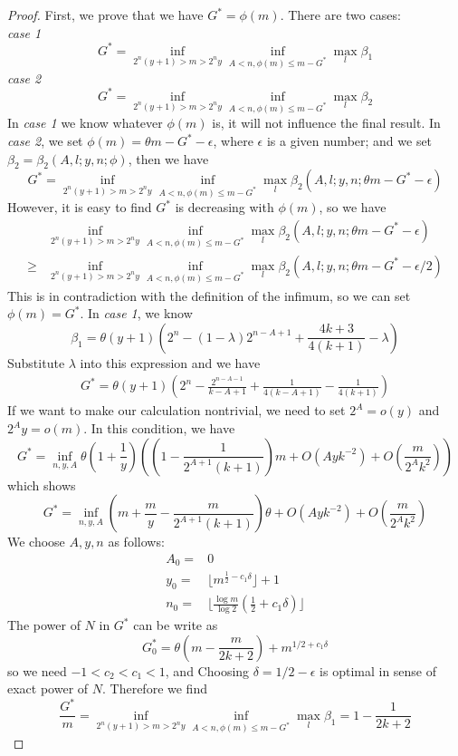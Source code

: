 \documentclass[10pt]{article}
\begin{document}
\begin{proof}
First, we prove that we have $G^*=\phi(m)$. There are two cases:\\
\emph{case 1}
\[
G^*=\inf\limits_{2^n(y+1)>m>2^ny}\inf\limits_{A<n,\phi(m)\leq m-G^*}\max\limits_{l}\beta_1
\]
\emph{case 2}
\[
G^*=\inf\limits_{2^n(y+1)>m>2^ny}\inf\limits_{A<n,\phi(m)\leq m-G^*}\max\limits_{l}\beta_2
\]
In \emph{case 1} we know whatever $\phi(m)$ is, it will not influence the final result. In \emph{case 2}, we set $\phi(m)=\theta m-G^*-\epsilon$, where $\epsilon$ is a given number; and we set $\beta_2=\beta_2(A,l;y,n;\phi)$, then we have
\[
G^*=\inf\limits_{2^n(y+1)>m>2^ny}\inf\limits_{A<n,\phi(m)\leq m-G^*}\max\limits_{l}\beta_2(A,l;y,n;\theta m-G^*-\epsilon)
\]
However, it is easy to find $G^*$ is decreasing with $\phi(m)$, so we have
\begin{align*}
&\inf\limits_{2^n(y+1)>m>2^ny}\inf\limits_{A<n,\phi(m)\leq m-G^*}\max\limits_{l}\beta_2(A,l;y,n;\theta m-G^*-\epsilon)\\
\geq&\inf\limits_{2^n(y+1)>m>2^ny}\inf\limits_{A<n,\phi(m)\leq m-G^*}\max\limits_{l}\beta_2(A,l;y,n;\theta m-G^*-\epsilon/2)
\end{align*}
This is in contradiction with the definition of the infimum, so we can set $\phi(m)=G^*$. In \emph{case 1}, we know
\[
\beta_1=\theta(y+1)(2^n-(1-\lambda)2^{n-A+1}+\frac{4k+3}{4(k+1)}-\lambda)
\]
Substitute $\lambda$ into this expression and we have
\begin{align*}
G^*=\theta(y+1)(2^n-\frac{2^{n-A-1}}{k-A+1}+\frac{1}{4(k-A+1)}-\frac{1}{4(k+1)})
\end{align*}
If we want to make our calculation nontrivial, we need to set $2^A=o(y)$ and $2^Ay=o(m)$. In this condition, we have
\[
G^*=\inf\limits_{n,y,A}\theta(1+\frac{1}{y})((1-\frac{1}{2^{A+1}(k+1)})m+O(Ayk^{-2})+O(\frac{m}{2^Ak^2}))
\]
which shows
\[
G^*=\inf\limits_{n,y,A}(m+\frac{m}{y}-\frac{m}{2^{A+1}(k+1)})\theta+O(Ayk^{-2})+O(\frac{m}{2^Ak^2})
\]
We choose $A,y,n$ as follows:
\begin{align*}
A_0=&0\\
y_0=&\lfloor{m^{\frac{1}{2}-c_1{\delta}}}\rfloor+1\\
n_0=&\lfloor\frac{\log{m}}{\log{2}}(\frac{1}{2}+c_1{\delta})\rfloor
\end{align*}
The power of $N$ in $G^*$ can be write as
\[
G^*_0=\theta(m-\frac{m}{2k+2})+m^{1/2+c_1\delta}
\]
so we need $-1<c_2<c_1<1$, and Choosing $\delta=1/2-\epsilon$ is optimal in sense of exact power of $N$. Therefore we find
\[
\frac{G^*}{m}=\inf\limits_{2^n(y+1)>m>2^ny}\inf\limits_{A<n,\phi(m)\leq m-G^*}\max\limits_{l}\beta_1=1-\frac{1}{2k+2}
\]
\end{proof}
\end{document}
